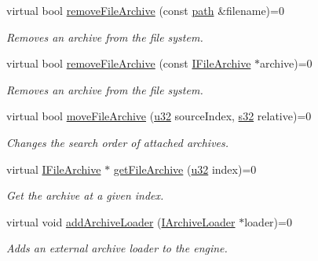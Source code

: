 \begin{DoxyCompactItemize}
virtual bool \hyperlink{classirr_1_1io_1_1IFileSystem_a03b405c8f5346c225c590cde585eb73c}{remove\+File\+Archive} (const \hyperlink{namespaceirr_1_1io_a6468281622ce3a1c46b72e19f32dded5}{path} \&filename)=0
\begin{DoxyCompactList}\small\item\em Removes an archive from the file system. \end{DoxyCompactList}\item 
virtual bool \hyperlink{classirr_1_1io_1_1IFileSystem_ab7579f5ccca7bc7c1e079f5cb38173ed}{remove\+File\+Archive} (const \hyperlink{classirr_1_1io_1_1IFileArchive}{I\+File\+Archive} $\ast$archive)=0
\begin{DoxyCompactList}\small\item\em Removes an archive from the file system. \end{DoxyCompactList}\item 
virtual bool \hyperlink{classirr_1_1io_1_1IFileSystem_ae8530fb9793373cf4dbee956090e99f6}{move\+File\+Archive} (\hyperlink{namespaceirr_a0416a53257075833e7002efd0a18e804}{u32} source\+Index, \hyperlink{namespaceirr_ac66849b7a6ed16e30ebede579f9b47c6}{s32} relative)=0
\begin{DoxyCompactList}\small\item\em Changes the search order of attached archives. \end{DoxyCompactList}\item 
\mbox{\label{classirr_1_1io_1_1IFileSystem_a1ac4bfb7bfd7d2961af8e5c128190fae}} 
virtual \hyperlink{classirr_1_1io_1_1IFileArchive}{I\+File\+Archive} $\ast$ \hyperlink{classirr_1_1io_1_1IFileSystem_a1ac4bfb7bfd7d2961af8e5c128190fae}{get\+File\+Archive} (\hyperlink{namespaceirr_a0416a53257075833e7002efd0a18e804}{u32} index)=0
\begin{DoxyCompactList}\small\item\em Get the archive at a given index. \end{DoxyCompactList}\item 
virtual void \hyperlink{classirr_1_1io_1_1IFileSystem_ad56456302b4697c49b461a909d9269b9}{add\+Archive\+Loader} (\hyperlink{classirr_1_1io_1_1IArchiveLoader}{I\+Archive\+Loader} $\ast$loader)=0
\begin{DoxyCompactList}\small\item\em Adds an external archive loader to the engine. \end{DoxyCompactList}\item 

\end{DoxyCompactItemize}
